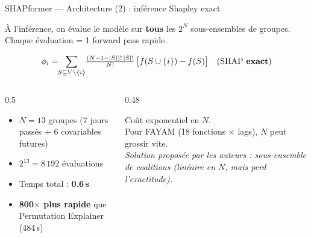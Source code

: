 \documentclass[10pt]{beamer}
\begin{document}
\begin{frame}{SHAPformer — Architecture (2) : inférence Shapley exact}
  \begin{tcolorbox}[colback=blue!3, colframe=blue!50!black, arc=3mm,
                    fonttitle=\bfseries, title=Calcul SHAP sans échantillonnage]
    À l'inférence, on évalue le modèle sur \textbf{tous} les $2^N$ sous-ensembles de groupes.\\
    Chaque évaluation = 1 forward pass rapide.
  \end{tcolorbox}

  \[
    \phi_i = \!\!\sum_{S \subseteq V\setminus\{i\}}\!
      \tfrac{(N-1-|S|)!\,|S|!}{N!}\,\bigl[f(S\cup\{i\}) - f(S)\bigr]
    \quad\text{(SHAP \textbf{exact})}
  \]

  \begin{columns}
    \begin{column}{0.5\textwidth}
      \begin{tcolorbox}[colback=orange!3, colframe=orange!60!black, arc=2mm,
                        fonttitle=\bfseries, title=Exemple TransnetBW]
        \begin{itemize}
          \item $N=13$ groupes (7 jours passés + 6 covariables futures)
          \item $2^{13} = 8\,192$ évaluations
          \item Temps total : \textbf{0.6\,s}
          \item \textbf{800$\times$ plus rapide} que Permutation Explainer (484\,s)
        \end{itemize}
      \end{tcolorbox}
    \end{column}
    \begin{column}{0.48\textwidth}
      \begin{tcolorbox}[colback=red!3, colframe=red!60!black, arc=2mm,
                        fonttitle=\bfseries, title=Limite mathématique]
        Coût exponentiel en $N$.\\[2pt]
        Pour FAYAM (18 fonctions × lags), $N$ peut grossir vite.\\[2pt]
        \emph{Solution proposée par les auteurs : sous-ensemble de coalitions (linéaire en $N$, mais perd l'exactitude).}
      \end{tcolorbox}
    \end{column}
  \end{columns}
\end{frame}
\end{document}
